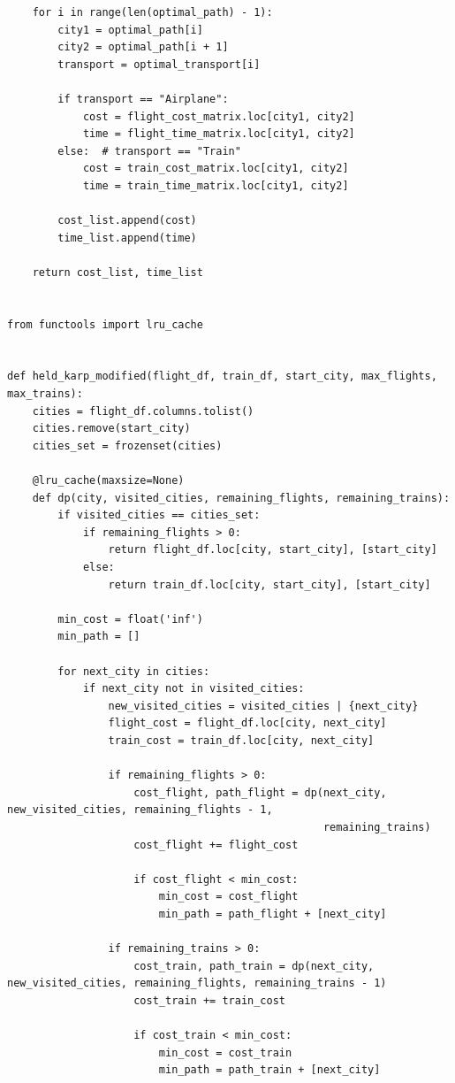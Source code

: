 \documentclass{article}
\begin{document}
\begin{lstlisting}
    for i in range(len(optimal_path) - 1):
        city1 = optimal_path[i]
        city2 = optimal_path[i + 1]
        transport = optimal_transport[i]

        if transport == "Airplane":
            cost = flight_cost_matrix.loc[city1, city2]
            time = flight_time_matrix.loc[city1, city2]
        else:  # transport == "Train"
            cost = train_cost_matrix.loc[city1, city2]
            time = train_time_matrix.loc[city1, city2]

        cost_list.append(cost)
        time_list.append(time)

    return cost_list, time_list


from functools import lru_cache


def held_karp_modified(flight_df, train_df, start_city, max_flights, max_trains):
    cities = flight_df.columns.tolist()
    cities.remove(start_city)
    cities_set = frozenset(cities)

    @lru_cache(maxsize=None)
    def dp(city, visited_cities, remaining_flights, remaining_trains):
        if visited_cities == cities_set:
            if remaining_flights > 0:
                return flight_df.loc[city, start_city], [start_city]
            else:
                return train_df.loc[city, start_city], [start_city]

        min_cost = float('inf')
        min_path = []

        for next_city in cities:
            if next_city not in visited_cities:
                new_visited_cities = visited_cities | {next_city}
                flight_cost = flight_df.loc[city, next_city]
                train_cost = train_df.loc[city, next_city]

                if remaining_flights > 0:
                    cost_flight, path_flight = dp(next_city, new_visited_cities, remaining_flights - 1,
                                                  remaining_trains)
                    cost_flight += flight_cost

                    if cost_flight < min_cost:
                        min_cost = cost_flight
                        min_path = path_flight + [next_city]

                if remaining_trains > 0:
                    cost_train, path_train = dp(next_city, new_visited_cities, remaining_flights, remaining_trains - 1)
                    cost_train += train_cost

                    if cost_train < min_cost:
                        min_cost = cost_train
                        min_path = path_train + [next_city]


\end{lstlisting}
\end{document}
